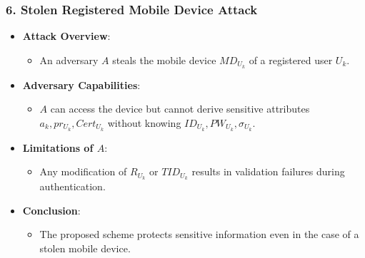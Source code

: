 \documentclass[9pt,handout]{beamer}
\begin{document}
\begin{frame}
    \frametitle{6. Stolen Registered Mobile Device Attack}
    \begin{itemize}
        \item \textbf{Attack Overview}:
            \begin{itemize}
                \item An adversary \( A \) steals the mobile device \( MD_{U_k} \) of a registered user \( U_k \).
            \end{itemize}
        \item \textbf{Adversary Capabilities}:
            \begin{itemize}
                \item \( A \) can access the device but cannot derive sensitive attributes \( a_k, pr_{U_k}, Cert_{U_k} \) without knowing \( ID_{U_k}, PW_{U_k}, \sigma_{U_k} \).
            \end{itemize}
        \item \textbf{Limitations of \( A \)}:
            \begin{itemize}
                \item Any modification of \( R_{U_k} \) or \( TID_{U_k} \) results in validation failures during authentication.
            \end{itemize}
        \item \textbf{Conclusion}:
            \begin{itemize}
                \item The proposed scheme protects sensitive information even in the case of a stolen mobile device.
            \end{itemize}
    \end{itemize}
\end{frame}
\end{document}

